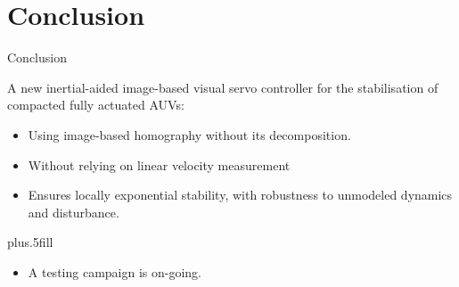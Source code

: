 \documentclass{beamer}
\begin{document}
\section{Conclusion}

\begin{frame}{Conclusion}

  A new inertial-aided image-based visual servo controller for the stabilisation of compacted fully actuated AUVs:
  \begin{itemize}
  \item
    Using image-based homography without its decomposition.
  \item
    Without relying on linear velocity measurement
  \item
    Ensures locally exponential stability, with robustness to unmodeled dynamics and disturbance.
  \end{itemize}
  
  \vskip0pt plus.5fill
  \begin{itemize}
  \item
    A testing campaign is on-going.    
  \end{itemize}
\end{frame}


\begin{frame}

\end{frame}



%
%    
%    
%
% 
%    
%
\end{document}
